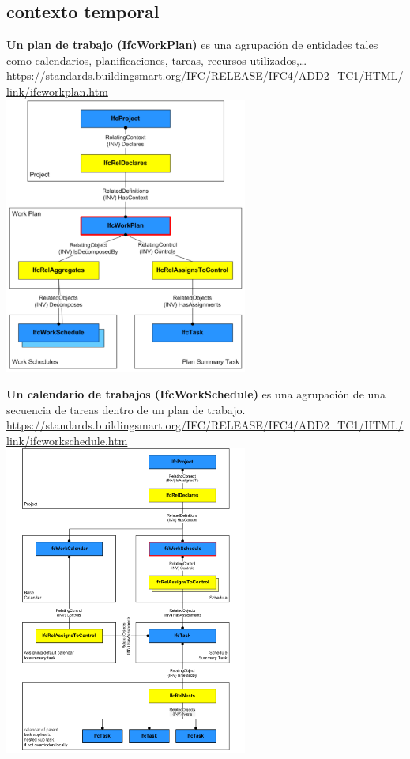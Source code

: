 \documentclass[spanish,12pt,a4paper,final,oneside]{book}
\begin{document}
\subsection{contexto temporal}
\textbf{Un plan de trabajo (IfcWorkPlan)} es una agrupación de entidades tales como calendarios, planificaciones, tareas, recursos utilizados,\ldots 
\\ \url{https://standards.buildingsmart.org/IFC/RELEASE/IFC4/ADD2_TC1/HTML/link/ifcworkplan.htm}
\\ \includegraphics[width=0.6\textwidth]{principales relaciones de IfcWorkPlan}

\vspace{1cm}

\textbf{Un calendario de trabajos (IfcWorkSchedule)} es una agrupación de una secuencia de tareas dentro de un plan de trabajo.
\\ \url{https://standards.buildingsmart.org/IFC/RELEASE/IFC4/ADD2_TC1/HTML/link/ifcworkschedule.htm}
\\ \includegraphics[width=0.6\textwidth]{principales relaciones de IfcWorkSchedule}
\end{document}
